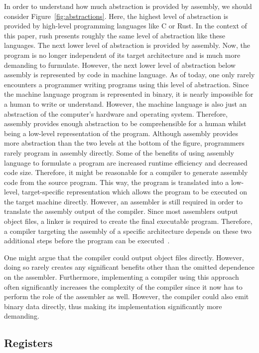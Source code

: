 In order to understand how much abstraction is provided by assembly, we should consider Figure~\ref{fig:abstractions}.
Here, the highest level of abstraction is provided by high-level programming languages like C or Rust.
In the context of this paper, rush presents roughly the same level of abstraction like these languages.
The next lower level of abstraction is provided by assembly.
Now, the program is no longer independent of its target architecture and is much more demanding to furmulate.
However, the next lower level of abstraction below assembly is represented by code in machine language.
As of today, one only rarely encounters a programmer writing programs using this level of abstraction.
Since the machine language program is represented in binary, it is nearly impossible for a human to write or understand.
However, the machine language is also just an abstraction of the computer's hardware and operating system.
Therefore, assembly provides enough abstraction to be comprehensible for a human whilst being a low-level representation of the program.
Although assembly provides more abstraction than the two levels at the bottom of the figure, programmers rarely program in assembly directly.
Some of the benefits of using assembly language to formulate a program are increased runtime efficiency and decreased code size.
Therefore, it might be reasonable for a compiler to generate assembly code from the source program.
This way, the program is translated into a low-level, target-specific representation which allows the program to be executed on the target machine directly.
However, an assembler is still required in order to translate the assembly output of the compiler.
Since most assemblers output object files, a linker is required to create the final executable program.
Therefore, a compiler targeting the assembly of a specific architecture depends on these two additional steps before the program can be executed~\cite[p.~5-6]{Dandamudi2005}.

One might argue that the compiler could output object files directly.
However, doing so rarely creates any significant benefits other than the omitted dependence on the assembler.
Furthermore, implementing a compiler using this approach often significantly increases the complexity of the compiler since it now has to perform the role of the assembler as well.
However, the compiler could also emit binary data directly, thus making its implementation significantly more demanding.

\subsection{Registers}

